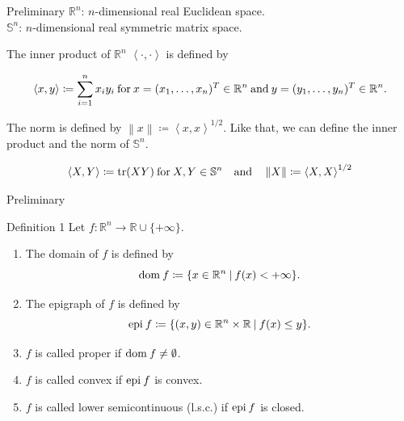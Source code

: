 \documentclass[aspectratio=169, dvipdfmx, 11pt]{beamer} %
\newcommand{\RealNumberSet}{\mathbb{R}}
\newcommand{\NDemenstionalRealEuclidianSpace}{\mathbb{R}^n}
\newcommand{\NDemenstionalRealSymmetricMatrixSpace}{\mathbb{S}^n}
\newcommand{\Domain}[1]{\text{\rm dom\:${#1}$}} %
\newcommand{\Epigraph}[1]{\text{\rm epi\:${#1}$}} %
\newcommand{\Trace}[1]{\text{\rm tr$({#1})$}} %
\newcommand{\InnerProduct}[2]{\left\langle {#1},{#2}\right\rangle} %
\newcommand{\ExtendedRealValuedFunction}[2]{{#1}: {#2} \to \RealNumberSet \cup \{+\infty\}}
\newcommand{\SetForm}[2]{
  \{{#1}\:|\:{#2}\}
}
\begin{document}
\begin{frame}{Preliminary}
$\NDemenstionalRealEuclidianSpace$: $n$-dimensional real Euclidean space. \\
$\NDemenstionalRealSymmetricMatrixSpace$: $n$-dimensional real symmetric matrix space.

The inner product of $\NDemenstionalRealEuclidianSpace$ $\left\langle \cdot ,\cdot \right\rangle$  is defined by

  \begin{equation}
    \InnerProduct{x}{y} \coloneqq \sum_{i = 1}^{n} x_i y_i \:\text{for}\: x=(x_1,\dots,x_n)^T \in \mathbb{R}^n \:\text{and}\: y=(y_1,\dots,y_n)^T \in \mathbb{R}^n. \notag
  \end{equation}

The norm is defined by $\left\lVert x \right\rVert \coloneqq \InnerProduct{x}{x} ^{1/2} $. Like that, we can define the inner product and the norm of $\NDemenstionalRealSymmetricMatrixSpace$.

  \begin{equation}
    \InnerProduct{X}{Y} \coloneqq \Trace{XY} \:\text{for}\: X,Y \in \NDemenstionalRealSymmetricMatrixSpace \quad \text{and} \quad \left\lVert X \right\rVert \coloneqq \InnerProduct{X}{X} ^{1/2} \notag
  \end{equation}
\end{frame}

\begin{frame}{Preliminary}
  \begin{block}{Definition 1}
    Let $\ExtendedRealValuedFunction{f}{\NDemenstionalRealEuclidianSpace}$.
    \begin{enumerate}
      \item The domain of $f$ is defined by
      \begin{equation}
        \Domain{f} \coloneqq \SetForm{x \in \NDemenstionalRealEuclidianSpace}{f(x) < +\infty}. \notag
      \end{equation}
      \item The epigraph of $f$ is defined by
      \begin{equation}
        \Epigraph{f} \coloneqq \SetForm{(x,y) \in \NDemenstionalRealEuclidianSpace \times \RealNumberSet}{f(x) \leq y}. \notag
      \end{equation}
      \item $f$ is called proper if $\Domain{f} \neq \emptyset$.
      \item $f$ is called convex if $\Epigraph{f}$ is convex.
      \item $f$ is called lower semicontinuous (l.s.c.) if $\Epigraph{f}$ is closed.
    \end{enumerate}
  \end{block}
\end{frame}
\end{document}
